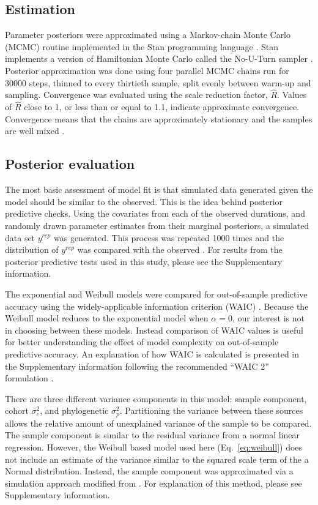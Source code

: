 \subsection{Estimation}
Parameter posteriors were approximated using a Markov-chain Monte Carlo (MCMC) routine implemented in the Stan programming language \cite{2014stan}. Stan implements a version of Hamiltonian Monte Carlo called the No-U-Turn sampler \cite{Hoffman-Gelman:2011}. Posterior approximation was done using four parallel MCMC chains run for 30000 steps, thinned to every thirtieth sample, split evenly between warm-up and sampling. Convergence was evaluated using the scale reduction factor, \(\hat{R}\). Values of \(\hat{R}\) close to 1, or less than or equal to 1.1, indicate approximate convergence. Convergence means that the chains are approximately stationary and the samples are well mixed \cite{Gelman2013d}.


\subsection{Posterior evaluation}
The most basic assessment of model fit is that simulated data generated given the model should be similar to the observed. This is the idea behind posterior predictive checks. Using the covariates from each of the observed durations, and randomly drawn parameter estimates from their marginal posteriors, a simulated data set \(y^{rep}\) was generated. This process was repeated 1000 times and the distribution of \(y^{rep}\) was compared with the observed \cite{Gelman2013d}. For results from the posterior predictive tests used in this study, please see the Supplementary information.

The exponential and Weibull models were compared for out-of-sample predictive accuracy using the widely-applicable information criterion (WAIC) \cite{Watanabe2010a}. Because the Weibull model reduces to the exponential model when \(\alpha = 0\), our interest is not in choosing between these models. Instead comparison of WAIC values is useful for better understanding the effect of model complexity on out-of-sample predictive accuracy. An explanation of how WAIC is calculated is presented in the Supplementary information following the recommended ``WAIC 2'' formulation \cite{Gelman2013d}.

There are three different variance components in this model: sample component, cohort \(\sigma_{c}^{2}\), and phylogenetic \(\sigma_{p}^{2}\). Partitioning the variance between these sources allows the relative amount of unexplained variance of the sample to be compared. The sample component is similar to the residual variance from a normal linear regression. However, the Weibull based model used here (Eq.~\ref{eq:weibull}) does not include an estimate of the variance similar to the squared scale term of the a Normal distribution. Instead, the sample component was approximated via a simulation approach modified from \cite{Goldstein2002}. For explanation of this method, please see Supplementary information.

